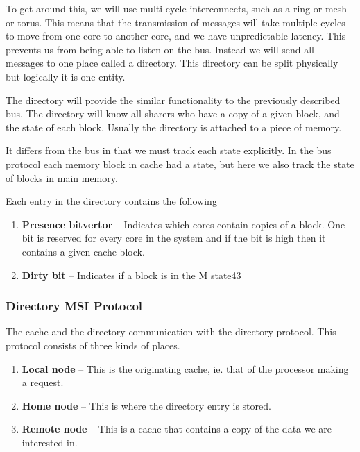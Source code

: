 \documentclass{article}
\begin{document}
To get around this, we will use multi-cycle interconnects, such as a ring or mesh or torus. This means that the transmission of messages will take multiple cycles to move from one core to another core, and we have unpredictable latency. This prevents us from being able to listen on the bus. Instead we will send all messages to one place called a directory. This directory can be split physically but logically it is one entity. 

The directory will provide the similar functionality to the previously described bus. The directory will know all sharers who have a copy of a given block, and the state of each block. Usually the directory is attached to a piece of memory. 

It differs from the bus in that we must track each state explicitly. In the bus protocol each memory block in cache had a state, but here we also track the state of blocks in main memory.

Each entry in the directory contains the following
\begin{enumerate}
\item \textbf{Presence bitvertor} -- Indicates which cores contain copies of a block. One bit is reserved for every core in the system and if the bit is high then it contains a given cache block.

\item \textbf{Dirty bit} -- Indicates if a block is in the M state43
\end{enumerate}

\subsubsection{Directory MSI Protocol}


The cache and the directory communication with the directory protocol. This protocol consists of three kinds of places. 

\begin{enumerate}
\item \textbf{Local node} -- This is the originating cache, ie. that of the processor making a request.

\item \textbf{Home node} -- This is where the directory entry is stored.

\item \textbf{Remote node} -- This is a cache that contains a copy of the data we are interested in.
\end{enumerate}
\end{document}

